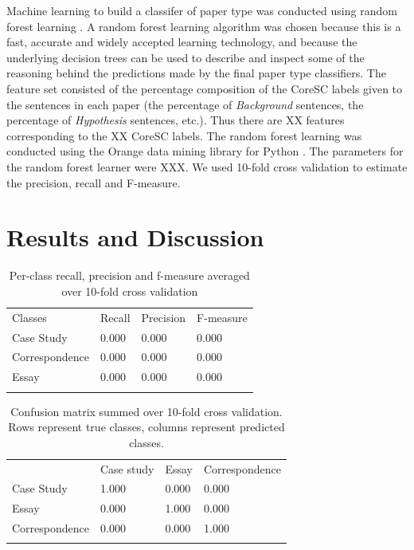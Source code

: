 \documentclass{svmult}
\begin{document}

Machine learning to build a classifer of paper type was conducted using random
forest learning \cite{Breiman2001}.  A random forest learning algorithm was
chosen because this is a fast, accurate and widely accepted learning
technology, and because the underlying decision trees can be used to describe
and inspect some of the reasoning behind the predictions made by the final
paper type classifiers.  The feature set consisted of the percentage
composition of the CoreSC labels given to the sentences in each paper (the
percentage of {\em Background} sentences, the percentage of {\em Hypothesis}
sentences, etc.).  Thus there are XX features corresponding to the XX CoreSC
labels.  The random forest learning was conducted using the Orange data mining
library for Python \cite{Curk2005}.  The parameters for the random forest
learner were XXX.  We used 10-fold cross validation to estimate the precision,
recall and F-measure.


\section{Results and Discussion}
\label{sec:3}

\begin{table}
\caption{Per-class recall, precision and f-measure averaged over 10-fold cross validation}
\label{tab:1}       %
\begin{tabular}{p{2cm}p{2.4cm}p{2cm}p{4.9cm}}
\hline\noalign{\smallskip}
Classes & Recall & Precision & F-measure  \\
\noalign{\smallskip}\svhline\noalign{\smallskip}
Case Study & 0.000 & 0.000 & 0.000 \\
Correspondence & 0.000 & 0.000 & 0.000 \\
Essay & 0.000 & 0.000 & 0.000 \\
\noalign{\smallskip}\hline\noalign{\smallskip}
\end{tabular}
\end{table}

\begin{table}
\caption{Confusion matrix summed over 10-fold cross validation. Rows represent true classes, columns represent predicted classes.}
\label{tab:2}       %
\begin{tabular}{p{2cm}p{2.4cm}p{2cm}p{4.9cm}}
\hline\noalign{\smallskip}
 & Case study & Essay & Correspondence  \\
\noalign{\smallskip}\svhline\noalign{\smallskip}
Case Study & 1.000 & 0.000 & 0.000 \\
Essay & 0.000 & 1.000 & 0.000 \\
Correspondence & 0.000 & 0.000 & 1.000 \\
\noalign{\smallskip}\hline\noalign{\smallskip}
\end{tabular}
\end{table}
\end{document}
